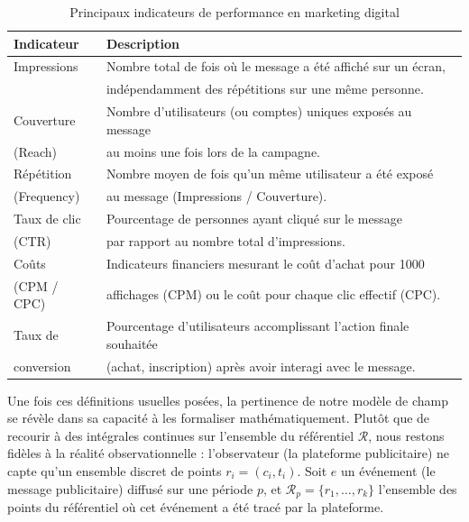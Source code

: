 \documentclass[11pt]{article}
\begin{document}
			\begin{table}[H]
				\centering
				\begin{tabular}{|l|l|}
					\hline 
					\textbf{Indicateur} & \textbf{Description} \\
					\hline 
					Impressions & Nombre total de fois où le message a été affiché sur un écran, \\   & indépendamment des répétitions sur une même personne. \\
					\hline 
					Couverture  & Nombre d'utilisateurs (ou comptes) uniques exposés au message \\  (Reach) & au moins une fois lors de la campagne. \\
					\hline 
					Répétition  & Nombre moyen de fois qu'un même utilisateur a été exposé 	\\ 
					(Frequency) & au message (Impressions / Couverture). \\
					\hline 
					Taux de clic  & Pourcentage de personnes ayant cliqué sur le message \\
					(CTR) &  par rapport au nombre total d'impressions.  \\
					\hline 
					Coûts  & Indicateurs financiers mesurant le coût d'achat pour 1000  \\
					(CPM / CPC) & affichages (CPM) ou le coût pour chaque clic effectif (CPC). \\
					\hline 
					Taux de & Pourcentage d'utilisateurs accomplissant l'action finale souhaitée \\ conversion & (achat, inscription) après avoir interagi avec le message. \\
					\hline 
				\end{tabular}
				\caption{Principaux indicateurs de performance en marketing digital}
			\end{table}
			
			
			\vspace{0.5cm}
			Une fois ces définitions usuelles posées, la pertinence de notre modèle de champ se révèle dans sa capacité à les formaliser mathématiquement. Plutôt que de recourir à des intégrales continues sur l'ensemble du référentiel $\mathcal{R}$, nous restons fidèles à la réalité observationnelle : l'observateur (la plateforme publicitaire) ne capte qu'un ensemble discret de points $r_i = (c_i, t_i)$. Soit $e$ un événement (le message publicitaire) diffusé sur une période $p$, et $\mathcal{R}_p = \{r_1, \ldots, r_k\}$ l'ensemble des points du référentiel où cet événement a été tracé par la plateforme.
			
\end{document}
